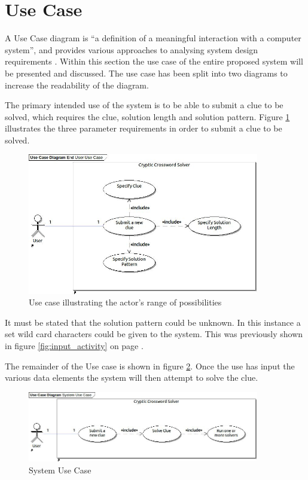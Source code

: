 \section{Use Case}
\label{sec:use_case}

A Use Case diagram is ``a definition of a meaningful interaction with a computer
system'', and provides various approaches to analysing system design 
requirements \citep{lunn03}. Within this section the use case of the entire 
proposed system will be presented and discussed. The use case has been split 
into two diagrams to increase the readability of the diagram.

The primary intended use of the system is to be able to submit a clue to be 
solved, which requires the clue, solution length and solution pattern. Figure 
\ref{fig:end_user_use_case} illustrates the three parameter requirements in 
order to submit a clue to be solved.

\begin{figure}[H]
  \centering
  \includegraphics[width=0.9\textwidth]{use_case/end_user_use_case.jpg}
  \caption{Use case illustrating the actor's range of possibilities}
  \label{fig:end_user_use_case}
\end{figure}

It must be stated that the solution pattern could be unknown. In this instance a
set wild card characters could be given to the system. This was previously shown
in figure \ref{fig:input_activity} on page \pageref{fig:input_activity}.

The remainder of the Use case is shown in figure \ref{fig:system_use_case}. Once
the use has input the various data elements the system will then attempt to 
solve the clue. 

\begin{figure}[H]
  \centering
  \includegraphics[width=0.9\textwidth]{use_case/system_use_case.jpg}
  \caption{System Use Case}
  \label{fig:system_use_case}
\end{figure}

